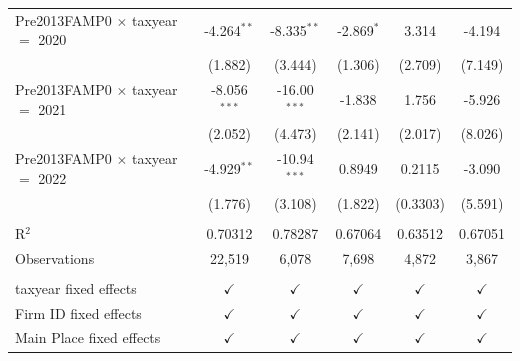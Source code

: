 \begin{tabular}{lccccc}
   Pre2013FAMP0 $\times$ taxyear $=$ 2020  & -4.264$^{**}$  & -8.335$^{**}$  & -2.869$^{*}$   & 3.314         & -4.194\\   
                                           & (1.882)        & (3.444)        & (1.306)        & (2.709)       & (7.149)\\   
   Pre2013FAMP0 $\times$ taxyear $=$ 2021  & -8.056$^{***}$ & -16.00$^{***}$ & -1.838         & 1.756         & -5.926\\   
                                           & (2.052)        & (4.473)        & (2.141)        & (2.017)       & (8.026)\\   
   Pre2013FAMP0 $\times$ taxyear $=$ 2022  & -4.929$^{**}$  & -10.94$^{***}$ & 0.8949         & 0.2115        & -3.090\\   
                                           & (1.776)        & (3.108)        & (1.822)        & (0.3303)      & (5.591)\\   
    \\
   R$^2$                                   & 0.70312        & 0.78287        & 0.67064        & 0.63512       & 0.67051\\  
   Observations                            & 22,519         & 6,078          & 7,698          & 4,872         & 3,867\\  
    \\
   taxyear fixed effects                   & $\checkmark$   & $\checkmark$   & $\checkmark$   & $\checkmark$  & $\checkmark$\\   
   Firm ID fixed effects                   & $\checkmark$   & $\checkmark$   & $\checkmark$   & $\checkmark$  & $\checkmark$\\   
   Main Place fixed effects                & $\checkmark$   & $\checkmark$   & $\checkmark$   & $\checkmark$  & $\checkmark$\\   
   \bottomrule
\end{tabular}
\par\endgroup
